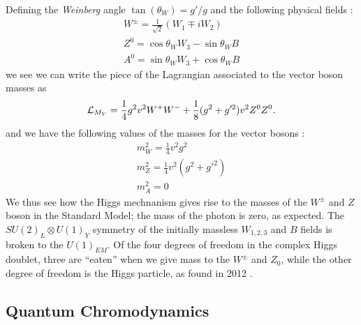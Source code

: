 Defining the \textit{Weinberg} angle $\tan(\theta_W) = g'/g$ and the following physical fields :
\begin{equation}
\begin{aligned}
W^{\pm} = \frac{1}{\sqrt{2}}(W_1 \mp iW_2) \\
Z^0 = \cos \theta_W W_3 - \sin\theta_W B \\
A^0 = \sin \theta_W W_3 + \cos\theta_W B
\end{aligned}
\end{equation}
we see we can write the piece of the Lagrangian associated to the vector boson masses as
\begin{equation}
\mathcal{L}_{M_V} = \frac{1}{4} g^2 v^2 W^+ W^- + \frac{1}{8} (g^2 + g'^2)v^2 Z^0 Z^0 .
\end{equation}
and we have the following values of the masses for the vector bosons :
\begin{equation}
\begin{aligned}
m_W^2 = \frac{1}{4}  v^2 g^2 \\
m_Z^2 = \frac{1}{4}  v^2 (g^2 + g'^2) \\
m_A^2 = 0
\end{aligned}
\end{equation}
We thus see how the Higgs mechnanism gives rise to the masses of the $W^{\pm}$ and $Z$ boson in the Standard Model; the mass of the photon is zero, as expected.
The $SU(2)_L \otimes U(1)_Y$ symmetry of the initially massless $W_{1,2,3}$ and $B$ fields is broken to the $U(1)_{EM}$.
Of the four degrees of freedom in the complex Higgs doublet, three are ``eaten'' when we give mass to the $W^\pm$ and $Z_0$, while the other degree of freedom is the Higgs particle, as found in 2012 .

\subsection{Quantum Chromodynamics}

